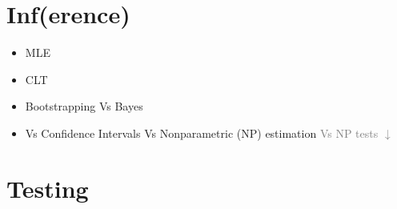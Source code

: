 \documentclass[11pt, oneside]{article}
\begin{document}
\section{Inf(erence)}

\begin{minipage}{.15\linewidth}
\begin{itemize}
\item MLE
\item CLT
\end{itemize}
\end{minipage}
\begin{minipage}{.85\linewidth}
\begin{itemize}
\item Bootstrapping Vs Bayes 
\item[] Vs Confidence Intervals Vs Nonparametric (NP) estimation \textcolor{gray}{Vs NP tests  $\downarrow$}
\end{itemize}
\end{minipage}

\section{Testing}
\end{document}
